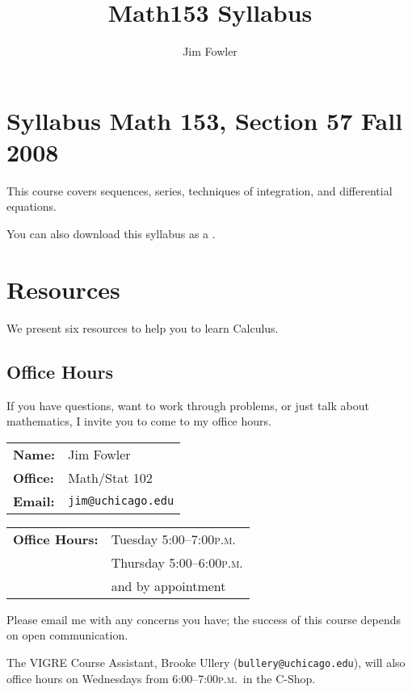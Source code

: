 \documentclass[12pt,letterpaper]{article}
\title{Math153 Syllabus}
\author{Jim Fowler}
\newcommand{\peem}{\textsc{p.m.}}
\begin{document}
\section*{\Large\sf Syllabus\hfill
Math 153, Section 57\hfill
Fall 2008}

This course covers sequences, series, techniques
of integration, and differential equations.

\begin{htmlonly}
You can also download this syllabus as a .
\end{htmlonly}

\section*{Resources}

We present six resources to help you to learn Calculus.

\subsection*{Office Hours}
If you have questions, want to work through problems, or just talk
about mathematics, I invite you to come to my office hours.
\begin{multicols}{2}
\begin{tabular}{ll}
\textbf{Name:} & Jim Fowler \\
\textbf{Office:} & Math/Stat 102 \\
\textbf{Email:} & \texttt{jim@uchicago.edu}
\end{tabular}

\begin{tabular}{ll}
\textbf{Office Hours:} & Tuesday 5:00--7:00\peem \\
& Thursday 5:00--6:00\peem \\
& and by appointment
\end{tabular}
\end{multicols}
\noindent
Please email me with any concerns you have; the success of this course
depends on open communication.

The VIGRE Course Assistant, Brooke Ullery
(\texttt{bullery@uchicago.edu}), will also office hours on
Wednesdays from 6:00--7:00\peem\ in the C-Shop.
\end{document}
